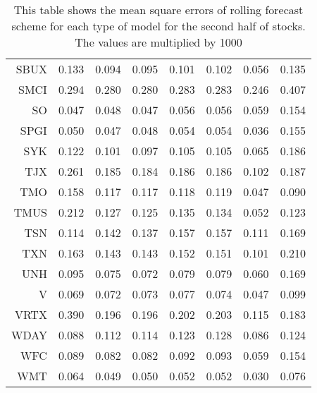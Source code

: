\begin{table}[ht]
\begin{tabular}{rrrrrrrr}
  SBUX & 0.133 & 0.094 & 0.095 & 0.101 & 0.102 & 0.056 & 0.135 \\ 
  SMCI & 0.294 & 0.280 & 0.280 & 0.283 & 0.283 & 0.246 & 0.407 \\ 
  SO & 0.047 & 0.048 & 0.047 & 0.056 & 0.056 & 0.059 & 0.154 \\ 
  SPGI & 0.050 & 0.047 & 0.048 & 0.054 & 0.054 & 0.036 & 0.155 \\ 
  SYK & 0.122 & 0.101 & 0.097 & 0.105 & 0.105 & 0.065 & 0.186 \\ 
  TJX & 0.261 & 0.185 & 0.184 & 0.186 & 0.186 & 0.102 & 0.187 \\ 
  TMO & 0.158 & 0.117 & 0.117 & 0.118 & 0.119 & 0.047 & 0.090 \\ 
  TMUS & 0.212 & 0.127 & 0.125 & 0.135 & 0.134 & 0.052 & 0.123 \\ 
  TSN & 0.114 & 0.142 & 0.137 & 0.157 & 0.157 & 0.111 & 0.169 \\ 
  TXN & 0.163 & 0.143 & 0.143 & 0.152 & 0.151 & 0.101 & 0.210 \\ 
  UNH & 0.095 & 0.075 & 0.072 & 0.079 & 0.079 & 0.060 & 0.169 \\ 
  V & 0.069 & 0.072 & 0.073 & 0.077 & 0.074 & 0.047 & 0.099 \\ 
  VRTX & 0.390 & 0.196 & 0.196 & 0.202 & 0.203 & 0.115 & 0.183 \\ 
  WDAY & 0.088 & 0.112 & 0.114 & 0.123 & 0.128 & 0.086 & 0.124 \\ 
  WFC & 0.089 & 0.082 & 0.082 & 0.092 & 0.093 & 0.059 & 0.154 \\ 
  WMT & 0.064 & 0.049 & 0.050 & 0.052 & 0.052 & 0.030 & 0.076 \\ 
   \hline
\end{tabular}
\caption[MSE rolling forecast (2)]{This table shows the mean square errors of rolling forecast scheme for each type of model for the second half of stocks. 
                     The values are multiplied by 1000} 
\label{Table:MSE_r_2}
\end{table}
